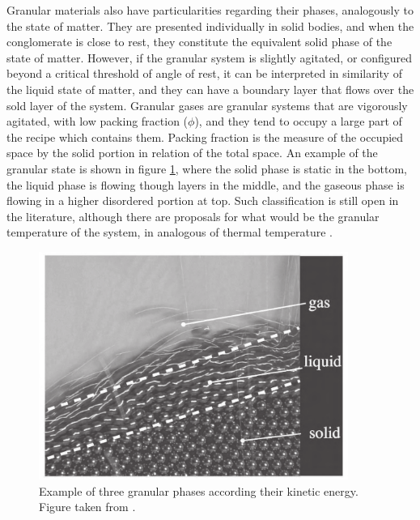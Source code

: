     Granular materials also have particularities regarding their phases, analogously to the state of matter. They are presented individually in solid bodies, and when the conglomerate is close to rest, they constitute the equivalent solid phase of the state of matter. However, if the granular system is slightly agitated, or configured beyond a critical threshold of angle of rest, it can be interpreted in similarity of the liquid state of matter, and they can have a boundary layer that flows over the sold layer of the system. Granular gases are granular systems that are vigorously agitated, with low packing fraction ($\phi$), and they tend to occupy a large part of the recipe which contains them. Packing fraction is the measure of the occupied space by the solid portion in relation of the total space. An example of the granular state is shown in figure \ref{fig:exemplo_fases}, where the solid phase is static in the bottom, the liquid phase is flowing though layers in the middle, and the gaseous phase is flowing in a higher disordered portion at top. Such classification is still open in the literature, although there are proposals for what would be the granular temperature of the system, in analogous of thermal temperature \cite{Granular_Solids_Liquids_and_Gases}.

    \begin{figure}
        \centering
        \includegraphics[width=0.9\textwidth]{04-figuras/Exemplo_Fases.png}
        \caption{Example of three granular phases according their kinetic energy. Figure taken from \cite{Granular_Media_Between_Fluid_and_Solid}.}
        \label{fig:exemplo_fases}
    \end{figure}


